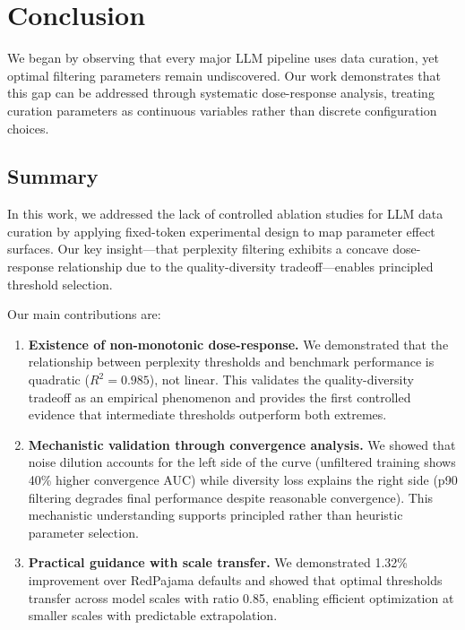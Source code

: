 \section{Conclusion}
\label{sec:conclusion}

We began by observing that every major LLM pipeline uses data curation, yet optimal filtering parameters remain undiscovered. Our work demonstrates that this gap can be addressed through systematic dose-response analysis, treating curation parameters as continuous variables rather than discrete configuration choices.

\subsection{Summary}

In this work, we addressed the lack of controlled ablation studies for LLM data curation by applying fixed-token experimental design to map parameter effect surfaces. Our key insight---that perplexity filtering exhibits a concave dose-response relationship due to the quality-diversity tradeoff---enables principled threshold selection.

Our main contributions are:

\begin{enumerate}
    \item \textbf{Existence of non-monotonic dose-response.} We demonstrated that the relationship between perplexity thresholds and benchmark performance is quadratic ($R^2=0.985$), not linear. This validates the quality-diversity tradeoff as an empirical phenomenon and provides the first controlled evidence that intermediate thresholds outperform both extremes.

    \item \textbf{Mechanistic validation through convergence analysis.} We showed that noise dilution accounts for the left side of the curve (unfiltered training shows 40\% higher convergence AUC) while diversity loss explains the right side (p90 filtering degrades final performance despite reasonable convergence). This mechanistic understanding supports principled rather than heuristic parameter selection.

    \item \textbf{Practical guidance with scale transfer.} We demonstrated 1.32\% improvement over RedPajama defaults and showed that optimal thresholds transfer across model scales with ratio 0.85, enabling efficient optimization at smaller scales with predictable extrapolation.
\end{enumerate}

